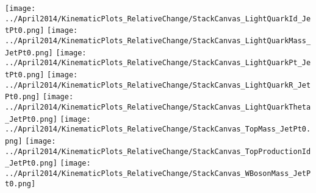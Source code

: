 \documentclass[a4paper,12pt]{report}
\begin{document}
\begin{center}
\texttt{[image: ../April2014/KinematicPlots\_RelativeChange/StackCanvas\_LightQuarkId\_JetPt0.png]}
\texttt{[image: ../April2014/KinematicPlots\_RelativeChange/StackCanvas\_LightQuarkMass\_JetPt0.png]}
\texttt{[image: ../April2014/KinematicPlots\_RelativeChange/StackCanvas\_LightQuarkPt\_JetPt0.png]}
\texttt{[image: ../April2014/KinematicPlots\_RelativeChange/StackCanvas\_LightQuarkR\_JetPt0.png]}
\texttt{[image: ../April2014/KinematicPlots\_RelativeChange/StackCanvas\_LightQuarkTheta\_JetPt0.png]}
\texttt{[image: ../April2014/KinematicPlots\_RelativeChange/StackCanvas\_TopMass\_JetPt0.png]}
\texttt{[image: ../April2014/KinematicPlots\_RelativeChange/StackCanvas\_TopProductionId\_JetPt0.png]}
\texttt{[image: ../April2014/KinematicPlots\_RelativeChange/StackCanvas\_WBosonMass\_JetPt0.png]}
\end{center}
\end{document}
